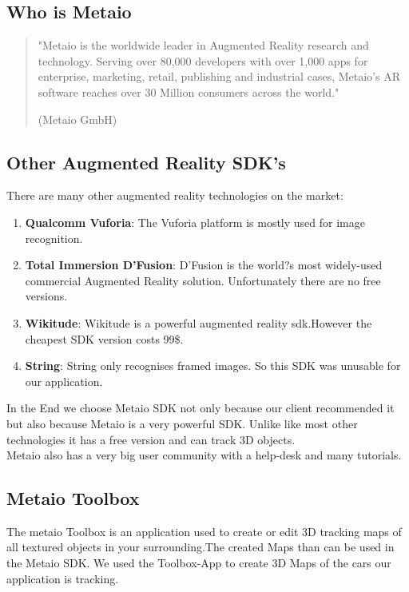 \subsection{Who is Metaio}
\begin{quotation}
"Metaio is the worldwide leader in Augmented Reality research and technology. Serving over 80,000 developers with over 1,000 apps for enterprise, marketing, retail, publishing and industrial cases, Metaio's AR software reaches over 30 Million consumers across the world." 
\begin{flushright}
(Metaio GmbH)
\end{flushright}
\end{quotation}

\subsection{Other Augmented Reality SDK's}
There are many other augmented reality technologies on the market: 
\begin{enumerate}
\item \textbf{Qualcomm Vuforia}: The Vuforia platform is mostly used for image recognition.

\item \textbf{Total Immersion D'Fusion}:
D'Fusion is the world?s most widely-used commercial Augmented Reality solution. Unfortunately there are no free versions.

\item \textbf{Wikitude}: Wikitude is a powerful augmented reality sdk.However the cheapest SDK version costs 99\$.

\item \textbf{String}: String only recognises framed images. So this SDK was unusable for our application.  
\end{enumerate} \cite{augmentedRealitySDk}

In the End we choose Metaio SDK not only because our client recommended it but also because Metaio is a very powerful SDK. Unlike like most other technologies it has a free version and can track 3D objects. 
\\



Metaio also has a very big user community with a help-desk and many tutorials.   
 
\subsection{Metaio Toolbox}
The metaio Toolbox is an application used to create or edit 3D tracking maps of all textured objects in your surrounding.The created Maps than can be used in the Metaio SDK. We used the Toolbox-App to create 3D Maps of the cars our application is tracking.
\\ 

